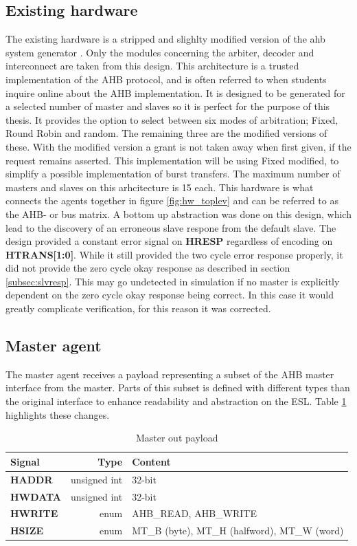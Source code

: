 \subsection{Existing hardware}
\label{sub:exist}
The existing hardware is a stripped and slighlty modified version of the ahb system generator \cite{ahbsys}. Only the modules concerning the arbiter, decoder and interconnect are taken from this design. This architecture is a trusted implementation of the AHB protocol, and is often referred to when students inquire online about the AHB implementation. It is designed to be generated for a selected number of master and slaves so it is perfect for the purpose of this thesis. It provides the option to select between six modes of arbitration; Fixed, Round Robin and random. The remaining three are the modified versions of these. With the modified version a grant is not taken away when first given, if the request remains asserted. This implementation will be using Fixed modified, to simplify a possible implementation of burst transfers. The maximum number of masters and slaves on this arhcitecture is 15 each. This hardware is what connects the agents together in figure \ref{fig:hw_toplev} and can be referred to as the AHB- or bus matrix. A bottom up abstraction was done on this design, which lead to the discovery of an erroneous slave respone from the default slave. The design provided a constant error signal on \textbf{HRESP} regardless of encoding on \textbf{HTRANS[1:0]}. While it still provided the two cycle error response properly, it did not provide the zero cycle okay response as described in section \ref{subsec:slvresp}. This may go undetected in simulation if no master is explicitly dependent on the zero cycle okay response being correct. In this case it would greatly complicate verification, for this reason it was corrected.  
 
  
\subsection{Master agent}
The master agent receives a payload representing a subset of the AHB master interface from the master. Parts of this subset is defined with different types than the original interface to enhance readability and abstraction on the ESL. Table \ref{tab:mpayload} highlights these changes. 
\begin{table}[hbt] 
  \label{tab:mpayload}
  \begin{tabular}{|p{25mm}|r|p{10cm}|} 
  \hline
  \textbf{Signal} & \textbf{Type} & \textbf{Content} \\
    \hline
  \textbf{HADDR} & unsigned int & 32-bit \\
    \hline
  \textbf{HWDATA} & unsigned int & 32-bit \\
    \hline
  \textbf{HWRITE} & enum & AHB\_READ, AHB\_WRITE \\
    \hline  
\textbf{HSIZE} & enum & MT\_B (byte), MT\_H (halfword), MT\_W (word) \\
    \hline
  \end{tabular}
\caption{Master out payload}
\end{table}


